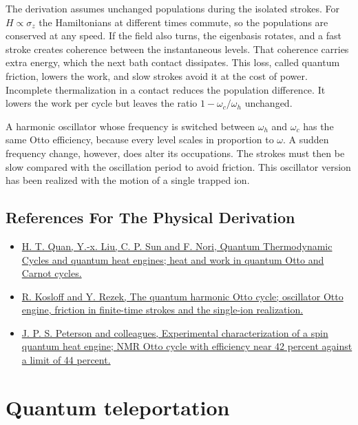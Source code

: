 \documentclass[11pt,oneside]{book}
\begin{document}
The derivation assumes unchanged populations during the isolated strokes. For \(H\propto\sigma_z\) the Hamiltonians at different times commute, so the populations are conserved at any speed. If the field also turns, the eigenbasis rotates, and a fast stroke creates coherence between the instantaneous levels. That coherence carries extra energy, which the next bath contact dissipates. This loss, called quantum friction, lowers the work, and slow strokes avoid it at the cost of power. Incomplete thermalization in a contact reduces the population difference. It lowers the work per cycle but leaves the ratio \(1-\omega_c/\omega_h\) unchanged.

A harmonic oscillator whose frequency is switched between \(\omega_h\) and \(\omega_c\) has the same Otto efficiency, because every level scales in proportion to \(\omega\). A sudden frequency change, however, does alter its occupations. The strokes must then be slow compared with the oscillation period to avoid friction. This oscillator version has been realized with the motion of a single trapped ion.

\subsection*{References For The Physical Derivation}
\begin{itemize}
\item \href{https://arxiv.org/abs/quant-ph/0611275}{H. T. Quan, Y.-x. Liu, C. P. Sun and F. Nori, Quantum Thermodynamic Cycles and quantum heat engines; heat and work in quantum Otto and Carnot cycles.}
\item \href{https://arxiv.org/abs/1612.03582}{R. Kosloff and Y. Rezek, The quantum harmonic Otto cycle; oscillator Otto engine, friction in finite-time strokes and the single-ion realization.}
\item \href{https://arxiv.org/abs/1803.06021}{J. P. S. Peterson and colleagues, Experimental characterization of a spin quantum heat engine; NMR Otto cycle with efficiency near 42 percent against a limit of 44 percent.}
\end{itemize}





\clearpage

\section{Quantum teleportation}
\end{document}

